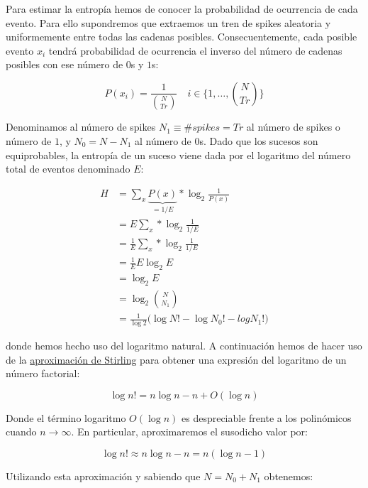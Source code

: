 \documentclass[11pt]{article}
\theoremstyle{plain}
\begin{document}
Para estimar la entropía hemos de conocer la probabilidad de ocurrencia de cada evento. Para ello supondremos que extraemos un tren de spikes aleatoria y uniformemente entre todas las cadenas posibles. Consecuentemente, cada posible evento $x_i$ tendrá probabilidad de ocurrencia el inverso del número de cadenas posibles con ese número de $0$s y $1$s:

\[
	P(x_i) = \frac{1}{\binom{N}{Tr}} \quad i \in \{1, \ldots, \binom{N}{Tr}\}
\]

Denominamos al número de spikes $N_1 \equiv \#spikes = Tr$ al número de spikes o número de $1$, y $N_0 = N - N_1$ al número de $0$s. Dado que los sucesos son equiprobables, la entropía de un suceso viene dada por el logaritmo del número total de eventos denominado $E$:

\[
	\begin{align*}
		H & = \sum_x \underbrace{P(x)}_{= 1/E} * \log_2 \frac{1}{P(x)} \\
		& = E \sum_x * \log_2 \frac{1}{1 / E} \\
		& = \frac{1}{E} \sum_x * \log_2 \frac{1}{1 / E} \\
		& = \frac{1}{E} E \log_2 E \\
		& = \log_2 E \\
		& = \log_2 \binom{N}{N_1} \\
		& = \frac{1}{\log 2} \bigg( \log N! - \log N_0! - log N_1! \bigg)
	\end{align*}	
\]

donde hemos hecho uso del logaritmo natural. A continuación hemos de hacer uso de la \href{https://en.wikipedia.org/wiki/Stirling\%27s_approximation}{aproximación de Stirling} para obtener una expresión del logaritmo de un número factorial:

\[
	\log n! = n \log n - n + O(\log n)
\]

Donde el término logaritmo $O(\log n)$ es despreciable frente a los polinómicos cuando $n \rightarrow \infty$. En particular, aproximaremos el susodicho valor por:

\[
	\log n! \approx n \log n - n = n (\log n - 1)
\]

Utilizando esta aproximación y sabiendo que $N = N_0 + N_1$ obtenemos:
\end{document}
